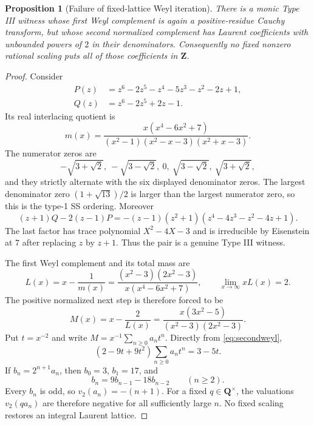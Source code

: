 \documentclass[11pt,reqno]{amsart}
\newtheorem{proposition}[theorem]{Proposition}
\theoremstyle{definition}
\theoremstyle{remark}
\newcommand{\Q}{\mathbf Q}
\newcommand{\Z}{\mathbf Z}
\begin{document}
\begin{proposition}[Failure of fixed-lattice Weyl iteration]
\label{prop:weylfailure}
There is a monic Type III witness whose first Weyl complement is again a
positive-residue Cauchy transform, but whose second normalized complement has
Laurent coefficients with unbounded powers of $2$ in their denominators.
Consequently no fixed nonzero rational scaling puts all of those coefficients
in $\Z$.
\end{proposition}

\begin{proof}
Consider
\begin{align*}
 P(z)&=z^6-2z^5-z^4-5z^3-z^2-2z+1,\\
 Q(z)&=z^6-2z^5+2z-1.
\end{align*}
Its real interlacing quotient is
\begin{equation}\label{eq:weylm}
 m(x)=\frac{x(x^4-6x^2+7)}
 {(x^2-1)(x^2-x-3)(x^2+x-3)}.
\end{equation}
The numerator zeros are
\[
 -\sqrt{3+\sqrt2},\ -\sqrt{3-\sqrt2},\ 0,\
 \sqrt{3-\sqrt2},\ \sqrt{3+\sqrt2},
\]
and they strictly alternate with the six displayed denominator zeros.  The
largest denominator zero $(1+\sqrt{13})/2$ is larger than the largest
numerator zero, so this is the type-1 SS ordering.  Moreover
\begin{equation}\label{eq:weylfactor}
 (z+1)Q-2(z-1)P
 =-(z-1)(z^2+1)(z^4-4z^3-z^2-4z+1).
\end{equation}
The last factor has trace polynomial $X^2-4X-3$ and is irreducible by
Eisenstein at $7$ after replacing $z$ by $z+1$.  Thus the pair is a genuine
Type III witness.

The first Weyl complement and its total mass are
\begin{equation}\label{eq:firstweyl}
 L(x)=x-\frac1{m(x)}
 =\frac{(x^2-3)(2x^2-3)}{x(x^4-6x^2+7)},
 \qquad \lim_{x\to\infty}xL(x)=2.
\end{equation}
The positive normalized next step is therefore forced to be
\begin{equation}\label{eq:secondweyl}
 M(x)=x-\frac2{L(x)}
 =\frac{x(3x^2-5)}{(x^2-3)(2x^2-3)}.
\end{equation}
Put $t=x^{-2}$ and write $M=x^{-1}\sum_{n\ge0}a_nt^n$.  Directly from
\eqref{eq:secondweyl},
\[
 (2-9t+9t^2)\sum_{n\ge0}a_nt^n=3-5t.
\]
If $b_n=2^{n+1}a_n$, then $b_0=3$, $b_1=17$, and
\[
 b_n=9b_{n-1}-18b_{n-2}\qquad(n\ge2).
\]
Every $b_n$ is odd, so $v_2(a_n)=-(n+1)$.  For a fixed
$q\in\Q^\times$, the valuations $v_2(qa_n)$ are therefore negative for all
sufficiently large $n$.  No fixed scaling restores an integral Laurent
lattice.
\end{proof}
\end{document}
